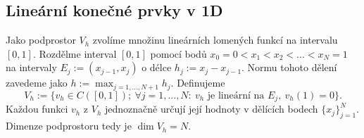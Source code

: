 \subsection{Lineární konečné prvky v 1D}
Jako podprostor $V_h$ zvolíme množinu lineárních lomených funkcí na intervalu $[0,1]$.
Rozdělme interval $[0,1]$ pomocí bodů $x_0=0<x_1<x_2<...<x_{N}=1$ na intervaly $E_j:=(x_{j-1},x_j)$ o délce $h_j:=x_j-x_{j-1}$.
Normu tohoto dělení zavedeme jako $h:=\max_{j=1,...,N+1} h_j$.
Definujeme
\[ V_h:=\{v_h\in C([0,1]);~\forall j=1,...,N:~v_h \mbox{ je lineární na }E_j,~v_h(1)=0 \}. \]
Každou funkci $v_h$ z $V_h$ jednoznačně určují její hodnoty v dělících bodech $\{x_j\}_{j=1}^N$.
Dimenze podprostoru tedy je $\dim V_h=N$.

